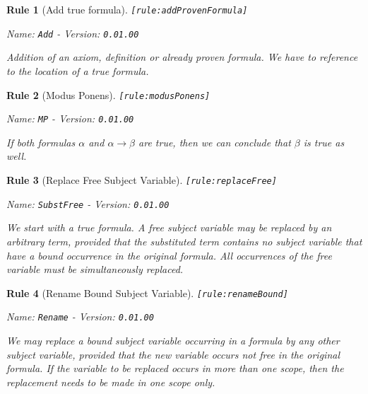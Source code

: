 \documentclass[a4paper,german,10pt,twoside]{book}
\newtheorem{rul}{Rule}
\theoremstyle{definition}
\theoremstyle{remark}
\begin{document}
\begin{rul}[Add true formula]
\label{rule:addProvenFormula} \hypertarget{rule:addProvenFormula}{}
{\tt \tiny [\verb]rule:addProvenFormula]]}

\par
{\em   Name: \verb]Add]  -  Version: \verb]0.01.00]}


Addition of an axiom, definition or already proven formula. We have to reference to the location of a true formula.
\end{rul}


\begin{rul}[Modus Ponens]
\label{rule:modusPonens} \hypertarget{rule:modusPonens}{}
{\tt \tiny [\verb]rule:modusPonens]]}

\par
{\em   Name: \verb]MP]  -  Version: \verb]0.01.00]}


If both formulas $\alpha$ and $\alpha \rightarrow \beta$ are true, then we can conclude that $\beta$ is true as well.
\end{rul}


\begin{rul}[Replace Free Subject Variable]
\label{rule:replaceFree} \hypertarget{rule:replaceFree}{}
{\tt \tiny [\verb]rule:replaceFree]]}

\par
{\em   Name: \verb]SubstFree]  -  Version: \verb]0.01.00]}


We start with a true formula.
A free subject variable may be replaced by an arbitrary term, provided that the substituted term contains no subject variable that have a bound occurrence in the original formula. All occurrences of the free variable must be simultaneously replaced.
\end{rul}


\begin{rul}[Rename Bound Subject Variable]
\label{rule:renameBound} \hypertarget{rule:renameBound}{}
{\tt \tiny [\verb]rule:renameBound]]}

\par
{\em   Name: \verb]Rename]  -  Version: \verb]0.01.00]}


We may replace a bound subject variable occurring in a formula by any other subject variable, provided that the new variable occurs not free in the original formula. If the variable to be replaced occurs in more than one scope, then the replacement needs to be made in one scope only.
\end{rul}
\end{document}
